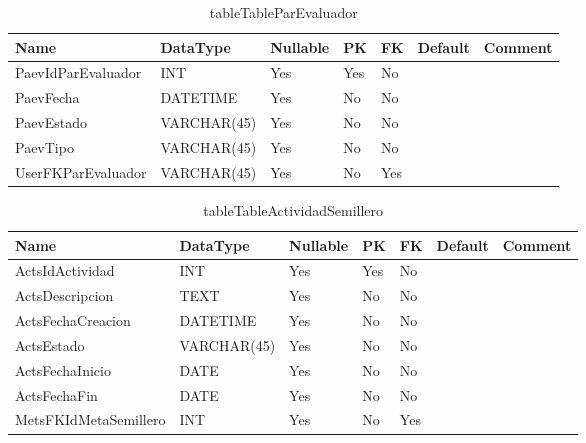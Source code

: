 \begin{table}
	\caption{tableTableParEvaluador}
	\label{labelTableParEvaluador}
	\begin{tabular}{ |l|l|l|l|l|l|l| }
		\hline
		Name & DataType & Nullable & PK & FK & Default & Comment \\ \hline
		PaevIdParEvaluador & INT & Yes & Yes & No &  & \\ \hline 
		PaevFecha & DATETIME & Yes & No & No &  & \\ \hline 
		PaevEstado & VARCHAR(45) & Yes & No & No &  & \\ \hline 
		PaevTipo & VARCHAR(45) & Yes & No & No &  & \\ \hline 
		UserFKParEvaluador & VARCHAR(45) & Yes & No & Yes &  & \\ \hline 
		
	\end{tabular}
\end{table}


\begin{table}
	\caption{tableTableActividadSemillero}
	\label{labelTableActividadSemillero}
	\begin{tabular}{ |l|l|l|l|l|l|l| }
		\hline
		Name & DataType & Nullable & PK & FK & Default & Comment \\ \hline
		ActsIdActividad & INT & Yes & Yes & No &  & \\ \hline 
		ActsDescripcion & TEXT & Yes & No & No &  & \\ \hline 
		ActsFechaCreacion & DATETIME & Yes & No & No &  & \\ \hline 
		ActsEstado & VARCHAR(45) & Yes & No & No &  & \\ \hline 
		ActsFechaInicio & DATE & Yes & No & No &  & \\ \hline 
		ActsFechaFin & DATE & Yes & No & No &  & \\ \hline 
		MetsFKIdMetaSemillero & INT & Yes & No & Yes &  & \\ \hline 
		
	\end{tabular}
\end{table}


